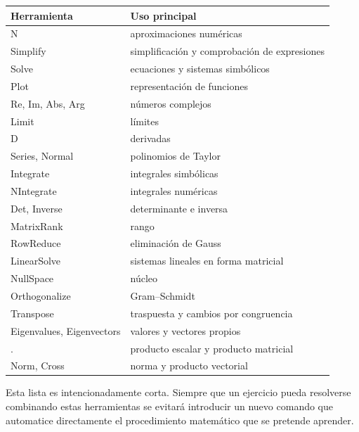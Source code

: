 \begin{center}
\small
\begin{tabularx}{\textwidth}{>{\ttfamily}l X}
\toprule
\textbf{Herramienta} & \textbf{Uso principal}\\
\midrule
N & aproximaciones numéricas\\
Simplify & simplificación y comprobación de expresiones\\
Solve & ecuaciones y sistemas simbólicos\\
Plot & representación de funciones\\
Re, Im, Abs, Arg & números complejos\\
Limit & límites\\
D & derivadas\\
Series, Normal & polinomios de Taylor\\
Integrate & integrales simbólicas\\
NIntegrate & integrales numéricas\\
Det, Inverse & determinante e inversa\\
MatrixRank & rango\\
RowReduce & eliminación de Gauss\\
LinearSolve & sistemas lineales en forma matricial\\
NullSpace & núcleo\\
Orthogonalize & Gram--Schmidt\\
Transpose & traspuesta y cambios por congruencia\\
Eigenvalues, Eigenvectors & valores y vectores propios\\
. & producto escalar y producto matricial\\
Norm, Cross & norma y producto vectorial\\
\bottomrule
\end{tabularx}
\end{center}

Esta lista es intencionadamente corta. Siempre que un ejercicio pueda resolverse combinando estas herramientas se evitará introducir un nuevo comando que automatice directamente el procedimiento matemático que se pretende aprender.
